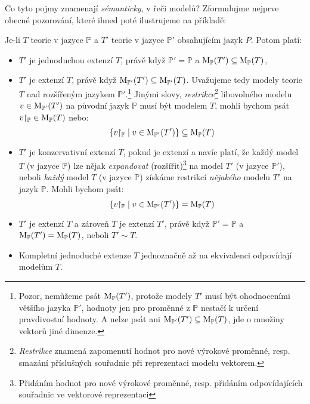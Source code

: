 Co tyto pojmy znamenají \emph{sémanticky}, v řeči modelů? Zformulujme nejprve obecné pozorování, které ihned poté ilustrujeme na příkladě:
\begin{observation}\label{observation:extensions-semantic-description-propositional}
    Je-li $T$ teorie v jazyce $\mathbb P$ a $T'$ teorie v jazyce $\mathbb P'$ obsahujícím jazyk $P$. Potom platí:
    \begin{itemize}
        \item $T'$ je jednoduchou extenzí $T$, právě když $\mathbb P'=\mathbb P$ a $\operatorname{M}_\mathbb P(T')\subseteq\operatorname{M}_\mathbb P(T)$,
        \item $T'$ je extenzí $T$, právě když $\operatorname{M}_{\mathbb P'}(T')\subseteq\operatorname{M}_{\mathbb P'}(T)$. Uvažujeme tedy modely teorie $T$ nad rozšířeným jazykem $\mathbb P'$.\footnote{Pozor, nemůžeme psát $\operatorname{M}_\mathbb P(T')$, protože modely $T'$ musí být ohodnoceními většího jazyka $\mathbb P'$, hodnoty jen pro proměnné z $\mathbb P$ nestačí k určení pravdivostní hodnoty. A nelze psát ani $\operatorname{M}_{\mathbb P'}(T')\subseteq\operatorname{M}_{\mathbb P}(T)$, jde o množiny vektorů jiné dimenze.} Jinými slovy, \emph{restrikce}\footnote{\emph{Restrikce} znamená zapomenutí hodnot pro nové výrokové proměnné, resp. smazání příslušných souřadnic při reprezentaci modelu vektorem.} libovolného modelu $v\in\operatorname{M}_{\mathbb P'}(T')$ na původní jazyk $\mathbb P$ musí být modelem $T$, mohli bychom psát $v{\restriction_\mathbb P}\in\operatorname{M}_\mathbb P(T)$ nebo:
        $$
        \{v{\restriction_\mathbb P}\mid v\in\operatorname{M}_{\mathbb P'}(T')\}\subseteq\operatorname{M}_\mathbb P(T)
        $$
        \item $T'$ je konzervativní extenzí $T$, pokud je extenzí a navíc platí, že každý model $T$ (v jazyce $\mathbb P$) lze nějak \emph{expandovat} (rozšířit)\footnote{Přidáním hodnot pro nové výrokové proměnné, resp. přidáním odpovídajících souřadnic ve vektorové reprezentaci} na model $T'$ (v jazyce $\mathbb P'$), neboli \emph{každý} model $T$ (v jazyce $\mathbb P$) získáme restrikcí \emph{nějakého} modelu $T'$ na jazyk $\mathbb P$. Mohli bychom psát:
        $$
        \{v{\restriction_\mathbb P}\mid v\in\operatorname{M}_      {\mathbb P'}(T')\}=\operatorname{M}_\mathbb P(T)
        $$
        \item $T'$ je extenzí $T$ a zároveň $T$ je extenzí $T'$, právě když $\mathbb P'=\mathbb P$ a $\operatorname{M}_\mathbb P(T')=\operatorname{M}_\mathbb P(T)$, neboli $T'\sim T$.        
        \item Kompletní jednoduché extenze $T$ jednoznačně až na ekvivalenci odpovídají modelům $T$.
    \end{itemize}
\end{observation}


